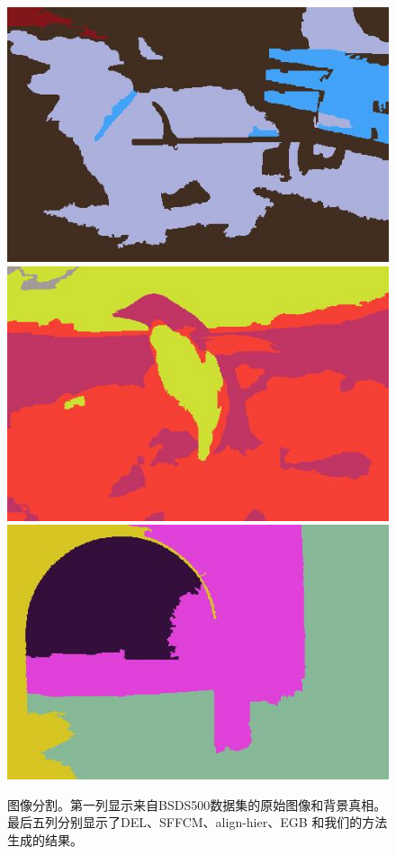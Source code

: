 \begin{figure}[h]
{\begin{minipage}[b]{0.13\linewidth}
\includegraphics[width=1\linewidth]{figures/img/make2/make2_247012.jpg}
\includegraphics[width=1\linewidth]{figures/img/make2/make2_106005.jpg}
\includegraphics[width=1\linewidth]{figures/img/make2/make2_5096.jpg}
\end{minipage}}
\hspace{-2.2mm}
\caption{图像分割。第一列显示来自BSDS500数据集的原始图像和背景真相。最后五列分别显示了DEL、SFFCM、align-hier、EGB 和我们的方法生成的结果。}
\label{fig5.3}
\end{figure}

